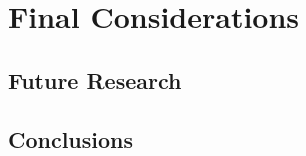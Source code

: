 \chapter{Final Considerations}\label{chap:conclusion}


\section{Future Research}
\section{Conclusions}